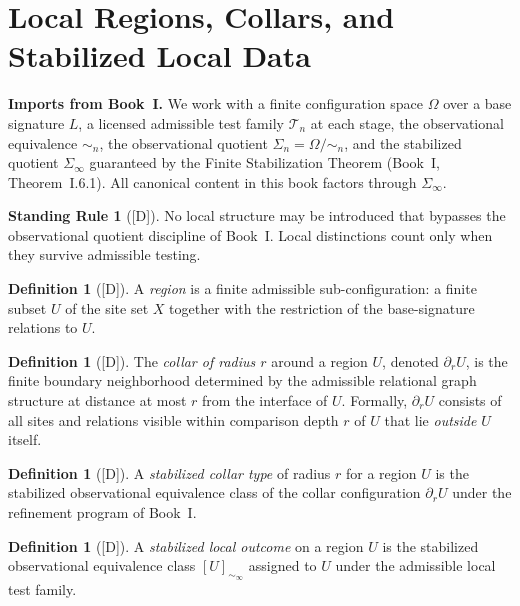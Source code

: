 \documentclass[12pt,oneside]{amsbook}
\theoremstyle{plain}
\theoremstyle{definition}
\newtheorem{definition}[theorem]{Definition}
\newtheorem{standingrule}[theorem]{Standing Rule}
\theoremstyle{remark}
\newcommand{\status}[1]{\textup{[#1]}}
\begin{document}
\section{Local Regions, Collars, and Stabilized Local Data}

\textbf{Imports from Book~I.}  We work with a finite configuration
space $\Omega$ over a base signature $L$, a licensed admissible test
family $\mathcal{T}_n$ at each stage, the observational equivalence
$\sim_n$, the observational quotient $\Sigma_n = \Omega/{\sim_n}$, and
the stabilized quotient $\Sigma_\infty$ guaranteed by the Finite
Stabilization Theorem (Book~I, Theorem~I.6.1).  All canonical content
in this book factors through $\Sigma_\infty$.

\begin{standingrule}[\status{D}]\label{sr:no-local-smuggling}
No local structure may be introduced that bypasses the observational
quotient discipline of Book~I.  Local distinctions count only when
they survive admissible testing.
\end{standingrule}

\begin{definition}[\status{D}]\label{def:region}
A \emph{region} is a finite admissible sub-configuration: a finite
subset $U$ of the site set $X$ together with the restriction of the
base-signature relations to $U$.
\end{definition}

\begin{definition}[\status{D}]\label{def:collar}
The \emph{collar of radius $r$} around a region $U$, denoted
$\partial_r U$, is the finite boundary neighborhood determined by the
admissible relational graph structure at distance at most $r$ from the
interface of $U$.  Formally, $\partial_r U$ consists of all sites and
relations visible within comparison depth $r$ of $U$ that lie
\emph{outside} $U$ itself.
\end{definition}

\begin{definition}[\status{D}]\label{def:stab-collar-type}
A \emph{stabilized collar type} of radius $r$ for a region $U$ is the
stabilized observational equivalence class of the collar configuration
$\partial_r U$ under the refinement program of Book~I.
\end{definition}

\begin{definition}[\status{D}]\label{def:stab-local-outcome}
A \emph{stabilized local outcome} on a region $U$ is the stabilized
observational equivalence class $[U]_{\sim_\infty}$ assigned to $U$
under the admissible local test family.
\end{definition}
\end{document}
